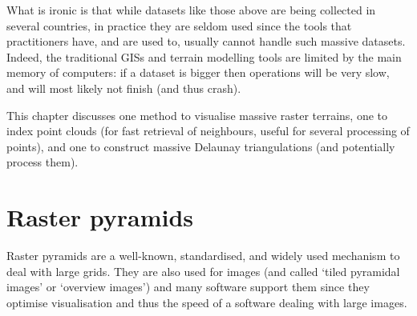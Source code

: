 %

What is ironic is that while datasets like those above are being collected in several countries, in practice they are seldom used since the tools that practitioners have, and are used to, usually cannot handle such massive datasets. 
Indeed, the traditional GISs and terrain modelling tools are limited by the main memory of computers: if a dataset is bigger then operations will be very slow, and will most likely not finish (and thus crash).

%

This chapter discusses one method to visualise massive raster terrains, one to index point clouds (for fast retrieval of neighbours, useful for several processing of points), and one to construct massive Delaunay triangulations (and potentially process them).



%
\section{Raster pyramids}%

Raster pyramids are a well-known, standardised, and widely used mechanism to deal with large grids.
They are also used for images (and called `tiled pyramidal images' or `overview images') and many software support them since they optimise visualisation and thus the speed of a software dealing with large images.

